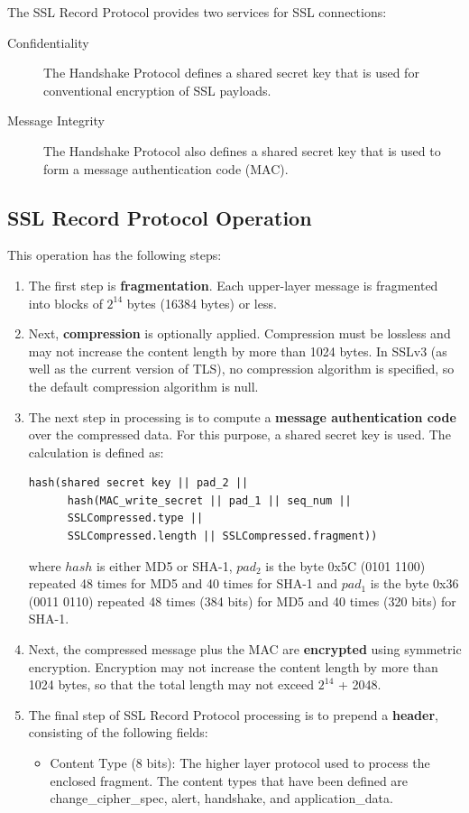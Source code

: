 \documentclass[12pt]{article}
\begin{document}
The SSL Record Protocol provides two services for SSL connections:
\begin{description}
\item[Confidentiality] The Handshake Protocol defines a shared secret key that is used for conventional encryption of SSL payloads.
\item[Message Integrity] The Handshake Protocol also defines a shared secret key that is used to form a message authentication code (MAC).
\end{description}
\subsection{SSL Record Protocol Operation}
This operation has the following steps:
\begin{enumerate}
\item The first step is \textbf{fragmentation}. Each upper-layer message is fragmented into blocks of $2^{14}$ bytes (16384 bytes) or less.
\item Next, \textbf{compression} is optionally applied. Compression must be lossless and may
not increase the content length by more than 1024 bytes. In SSLv3 (as well as the current version of TLS), no compression algorithm is specified, so the default compression algorithm is null.
\item The next step in processing is to compute a \textbf{message authentication code} over the compressed data. For this purpose, a shared secret key is used. The calculation is defined as:
\begin{verbatim}
hash(shared secret key || pad_2 ||
      hash(MAC_write_secret || pad_1 || seq_num ||
      SSLCompressed.type ||
      SSLCompressed.length || SSLCompressed.fragment))
\end{verbatim}
where $hash$ is either MD5 or SHA-1, $pad_2$ is the byte 0x5C (0101 1100) repeated 48 times for MD5 and 40 times for SHA-1 and $pad_1$ is the byte 0x36 (0011 0110) repeated 48 times (384 bits) for MD5 and 40 times (320 bits) for SHA-1.
\item Next, the compressed message plus the MAC are \textbf{encrypted} using symmetric encryption. Encryption may not increase the content length by more than 1024 bytes, so that the total length may not exceed $2^{14}$ + 2048.
\item The final step of SSL Record Protocol processing is to prepend a \textbf{header}, consisting of the following fields:
\begin{itemize}
\item Content Type (8 bits): The higher layer protocol used to process the enclosed fragment. The content types that have been defined are change\_cipher\_spec, alert, handshake, and application\_data.  

\end{itemize}
\end{enumerate}
\end{document}
